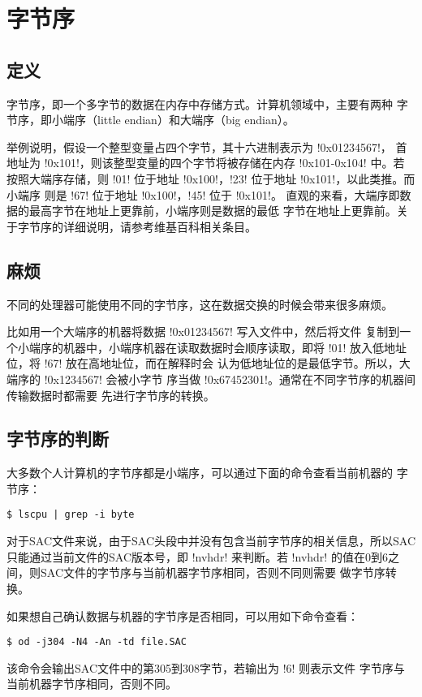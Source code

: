 \section{字节序}
\label{sec:endian}
\subsection{定义}
字节序，即一个多字节的数据在内存中存储方式。计算机领域中，主要有两种
字节序，即小端序（little endian）和大端序（big endian）。

举例说明，假设一个整型变量占四个字节，其十六进制表示为 !0x01234567!，
首地址为 !0x101!，则该整型变量的四个字节将被存储在内存
!0x101-0x104! 中。若按照大端序存储，则 !01! 位于地址
!0x100!，!23! 位于地址 !0x101!，以此类推。而小端序
则是 !67! 位于地址 !0x100!，!45! 位于 !0x101!。
直观的来看，大端序即数据的最高字节在地址上更靠前，小端序则是数据的最低
字节在地址上更靠前。关于字节序的详细说明，请参考维基百科相关条目。

\subsection{麻烦}
不同的处理器可能使用不同的字节序，这在数据交换的时候会带来很多麻烦。

比如用一个大端序的机器将数据 !0x01234567! 写入文件中，然后将文件
复制到一个小端序的机器中，小端序机器在读取数据时会顺序读取，即将
!01! 放入低地址位，将 !67! 放在高地址位，而在解释时会
认为低地址位的是最低字节。所以，大端序的 !0x1234567! 会被小字节
序当做 !0x67452301!。通常在不同字节序的机器间传输数据时都需要
先进行字节序的转换。

\subsection{字节序的判断}
大多数个人计算机的字节序都是小端序，可以通过下面的命令查看当前机器的
字节序：
\begin{verbatim}
$ lscpu | grep -i byte
\end{verbatim}

对于SAC文件来说，由于SAC头段中并没有包含当前字节序的相关信息，所以SAC
只能通过当前文件的SAC版本号，即 !nvhdr! 来判断。若 !nvhdr!
的值在0到6之间，则SAC文件的字节序与当前机器字节序相同，否则不同则需要
做字节序转换。

如果想自己确认数据与机器的字节序是否相同，可以用如下命令查看：
\begin{verbatim}
$ od -j304 -N4 -An -td file.SAC
\end{verbatim}
该命令会输出SAC文件中的第305到308字节，若输出为 !6! 则表示文件
字节序与当前机器字节序相同，否则不同。

